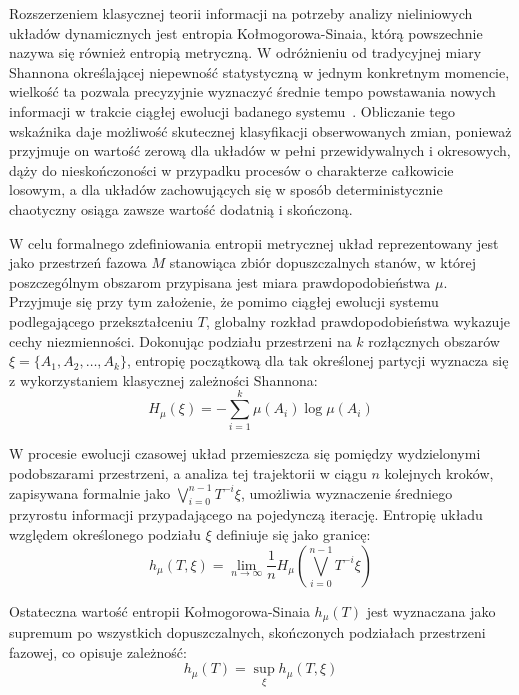 Rozszerzeniem klasycznej teorii informacji na potrzeby analizy nieliniowych układów dynamicznych jest entropia Kołmogorowa-Sinaia, którą powszechnie nazywa się również entropią metryczną. W odróżnieniu od tradycyjnej miary Shannona określającej niepewność statystyczną w jednym konkretnym momencie, wielkość ta pozwala precyzyjnie wyznaczyć średnie tempo powstawania nowych informacji w trakcie ciągłej ewolucji badanego systemu~\cite{EckmannRuelle1985}. Obliczanie tego wskaźnika daje możliwość skutecznej klasyfikacji obserwowanych zmian, ponieważ przyjmuje on wartość zerową dla układów w pełni przewidywalnych i okresowych, dąży do nieskończoności w przypadku procesów o charakterze całkowicie losowym, a dla układów zachowujących się w sposób deterministycznie chaotyczny osiąga zawsze wartość dodatnią i skończoną.

W celu formalnego zdefiniowania entropii metrycznej układ reprezentowany jest jako przestrzeń fazowa $M$ stanowiąca zbiór dopuszczalnych stanów, w której poszczególnym obszarom przypisana jest miara prawdopodobieństwa $\mu$. Przyjmuje się przy tym założenie, że pomimo ciągłej ewolucji systemu podlegającego przekształceniu $T$, globalny rozkład prawdopodobieństwa wykazuje cechy niezmienności. Dokonując podziału przestrzeni na $k$ rozłącznych obszarów $\xi = \{A_1, A_2, \dots, A_k\}$, entropię początkową dla tak określonej partycji wyznacza się z wykorzystaniem klasycznej zależności Shannona:
\begin{equation}
H_\mu(\xi) = -\sum_{i=1}^{k} \mu(A_i) \log \mu(A_i)
\label{eq:shannon_podzial}
\end{equation}
 
W procesie ewolucji czasowej układ przemieszcza się pomiędzy wydzielonymi podobszarami przestrzeni, a analiza tej trajektorii w ciągu $n$ kolejnych kroków, zapisywana formalnie jako $\bigvee_{i=0}^{n-1} T^{-i}\xi$, umożliwia wyznaczenie średniego przyrostu informacji przypadającego na pojedynczą iterację. Entropię układu względem określonego podziału $\xi$ definiuje się jako granicę:
\begin{equation}
h_\mu(T, \xi) = \lim_{n \to \infty} \frac{1}{n} H_\mu\left(\bigvee_{i=0}^{n-1} T^{-i}\xi\right)
\label{eq:entropia_wzgledem_podzialu}
\end{equation}
 
Ostateczna wartość entropii Kołmogorowa-Sinaia $h_\mu(T)$ jest wyznaczana jako supremum po wszystkich dopuszczalnych, skończonych podziałach przestrzeni fazowej, co opisuje zależność:
\begin{equation}
h_\mu(T) = \sup_{\xi} h_\mu(T, \xi)
\label{eq:ks_entropy_supremum}
\end{equation}
 
